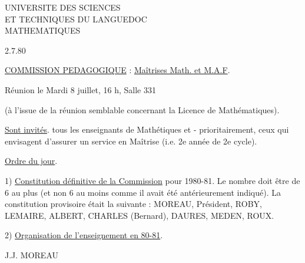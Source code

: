 
UNIVERSITE DES SCIENCES\\
ET TECHNIQUES DU LANGUEDOC\\
MATHEMATIQUES

2.7.80

\uline{COMMISSION PEDAGOGIQUE} : \uline{Maîtrises Math. et M.A.F}.

Réunion le Mardi 8 juillet, 16 h, Salle 331

(à l'issue de la réunion semblable concernant la Licence de Mathématiques).

\uline{Sont invités}. tous les enseignants de Mathétiques et - prioritairement, ceux qui envisagent d'assurer un service en Maîtrise (i.e. 2e année de 2e cycle).

\uline{Ordre du jour}.

1) \uline{Constitution définitive de la Commission} pour 1980-81. Le nombre doit être de 6 au plus (et non 6 au moins comme il avait été antérieurement indiqué). La constitution provisoire était la suivante : MOREAU, Président, ROBY, LEMAIRE, ALBERT, CHARLES (Bernard), DAURES, MEDEN, ROUX.

2) \uline{Organisation de l'enseignement en 80-81}.

J.J. MOREAU

